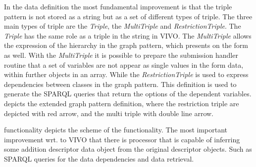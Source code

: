 In the data definition the most fundamental improvement is that the triple pattern is not stored as a string but as a set of different types of triple. The three main types of triple are the \textit{Triple}, the \textit{MultiTriple} and \textit{RestrictionTriple}. The \textit{Triple} has the same role as a triple in the string in VIVO. The \textit{MultiTriple} allows the expression of the hierarchy in the graph pattern, which presents on the form as well. With the \textit{MultiTriple} it is possible to prepare the submission handler routine that a set of variables are not appear as single values in the form data, within further objects in an array. While the \textit{RestrictionTriple} is used to express dependencies between classes in the graph pattern. This definition is used to generate the SPARQL queries that return the options of the dependent variables.  depicts the extended graph pattern definition, where the restriction triple are depicted with red arrow, and the multi triple with double line arrow.



 functionality depicts the scheme of the functionality. The most important improvement wrt. to VIVO that there is processor that is capable of inferring some addition descriptor data object from the original descriptor objects. Such as SPARQL queries for the data dependencies and data retrieval.  

